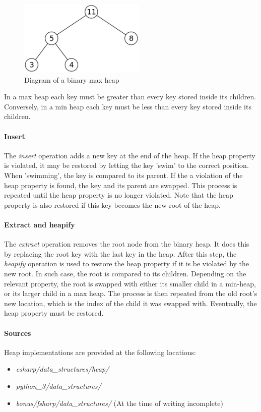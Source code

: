 \documentclass{article}
\begin{document}
{\begin{figure}[H]
  \centering
  \includegraphics[width=6cm]{binary_heap}
  \caption{Diagram of a binary max heap}
\end{figure}

In a max heap each key must be greater than every key stored inside its children.
Conversely, in a min heap each key must be less than every key stored inside its children.

\paragraph{Insert}
The {\em insert} operation adds a new key at the end of the heap. If the heap property is violated,
it may be restored by letting the key 'swim' to the correct position. When 'swimming', the key
is compared to its parent. If the a violation of the heap property is found, the key and its parent
are swapped. This process is repeated until the heap property is no longer violated. Note that the
heap property is also restored if this key becomes the new root of the heap.

\paragraph{Extract and heapify}
The {\em extract} operation removes the root node from the binary heap. It does this by replacing
the root key with the last key in the heap. After this step, the {\em heapify} operation is used to
restore the heap property if it is be violated by the new root. In such case, the root is compared
to its children. Depending on the relevant property, the root is swapped with either its smaller child in a
min-heap, or its larger child in a max heap. The process is then repeated from the old root's new location,
which is the index of the child it was swapped with. Eventually, the heap property must be restored.

\paragraph{Sources}
Heap implementations are provided at the following locations:
\begin{itemize}
\item{{\em csharp/data\_structures/heap/}}
\item{{\em python\_3/data\_structures/}}
\item{{\em bonus/fsharp/data\_structures/} (At the time of writing incomplete)}
\end{itemize}


}
\end{document}
